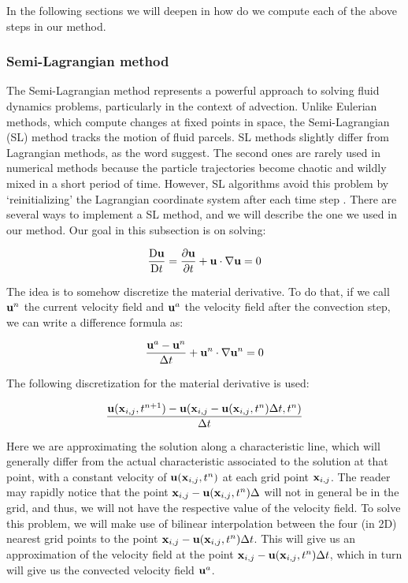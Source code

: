In the following sections we will deepen in how do we compute each of the above steps in our method.

\subsubsection*{Semi-Lagrangian method}
The Semi-Lagrangian method represents a powerful approach to solving fluid dynamics problems, particularly in the context of advection. Unlike Eulerian methods, which compute changes at fixed points in space, the Semi-Lagrangian (SL) method tracks the motion of fluid parcels. SL methods slightly differ from Lagrangian methods, as the word suggest. The second ones are rarely used in numerical methods because the particle trajectories become chaotic and wildly mixed in a short period of time. However, SL algorithms avoid this problem by `reinitializing' the Lagrangian coordinate system after each time step \cite{Boyd2001ChebyshevFourier}. There are several ways to implement a SL method, and we will describe the one we used in our method. Our goal in this subsection is on solving:

\begin{equation*}
  \frac{\mathrm{D}\boldsymbol{\mathrm{u}}}{\mathrm{D}t} = \pdv{\boldsymbol{\mathrm{u}}}{t} + \boldsymbol{\mathrm{u}} \cdot \nabla \boldsymbol{\mathrm{u}} = 0
\end{equation*}

The idea is to somehow discretize the material derivative. To do that, if we call $\boldsymbol{\mathrm{u}}^n$ the current velocity field and $\boldsymbol{\mathrm{u}}^a$ the velocity field after the convection step, we can write a difference formula as:

\begin{equation*}
  \frac{\boldsymbol{\mathrm{u}}^a- \boldsymbol{\mathrm{u}}^n}{\Delta t} + \boldsymbol{\mathrm{u}}^n \cdot \nabla \boldsymbol{\mathrm{u}}^n = 0
\end{equation*}

The following discretization for the material derivative is used:

\begin{equation*}
  \frac{\boldsymbol{\mathrm{u}}(\boldsymbol{\mathrm{x}}_{i,j},t^{n+1})  - \boldsymbol{\mathrm{u}}(\boldsymbol{\mathrm{x}}_{i,j} - \boldsymbol{\mathrm{u}}(\boldsymbol{\mathrm{x}}_{i,j},t^n)\Delta t,t^n)}{\Delta t}
\end{equation*}

Here we are approximating the solution along a characteristic line, which will generally differ from the actual characteristic associated to the solution at that point, with a constant velocity of $\boldsymbol{\mathrm{u}}(\boldsymbol{\mathrm{x}}_{i,j},t^n)$ at each grid point $\boldsymbol{\mathrm{x}}_{i,j}$.
The reader may rapidly notice that the point $\boldsymbol{\mathrm{x}}_{i,j} - \boldsymbol{\mathrm{u}}(\boldsymbol{\mathrm{x}}_{i,j},t^n)\Delta$ will not in general be in the grid, and thus, we will not have the respective value of the velocity field. To solve this problem, we will make use of bilinear interpolation between the four (in 2D) nearest grid points to the point $\boldsymbol{\mathrm{x}}_{i,j} - \boldsymbol{\mathrm{u}}(\boldsymbol{\mathrm{x}}_{i,j},t^n)\Delta t$. This will give us an approximation of the velocity field at the point $\boldsymbol{\mathrm{x}}_{i,j} - \boldsymbol{\mathrm{u}}(\boldsymbol{\mathrm{x}}_{i,j},t^n)\Delta t$, which in turn will give us the convected velocity field $\boldsymbol{\mathrm{u}}^a$.

